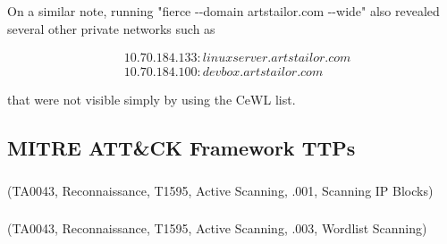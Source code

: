 \documentclass[notitlepage]{article}
\begin{document}
    On a similar note, running  "fierce -{}-domain artstailor.com -{}-wide" also revealed several other private networks such as
    
    \begin{align*}
    & 10.70.184.133 : linuxserver.artstailor.com \\
    & 10.70.184.100 : devbox.artstailor.com 
    \end{align*}
    
    that were not visible simply by using the CeWL list.
    
    \subsection{MITRE ATT{\&}CK Framework TTPs}
    \subsubsection*{}
    \ttp(TA0043, Reconnaissance, T1595, Active Scanning, .001, Scanning IP Blocks)
    \subsubsection*{}
    \ttp(TA0043, Reconnaissance, T1595, Active Scanning, .003, Wordlist Scanning)

    
\end{document}
